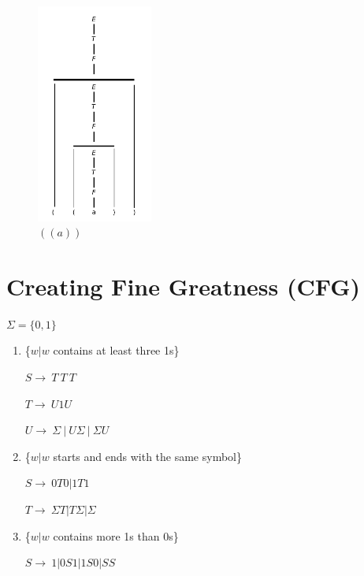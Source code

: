 \documentclass[10pt,reqno,sumlimits]{amsart}
\theoremstyle{plain}
\theoremstyle{definition}
\newcommand{\1}{{\bf 1}}
\numberwithin{equation}{section}
\begin{document}
\begin{figure}[htbp]
\centerline{
    \mbox{\includegraphics[width=1.5in]{figures/3_1_d.pdf}}
  }
  \caption{$((a))$}
  \label{fig:fit}
\end{figure}

\section {Creating Fine Greatness (CFG)}
\hspace{0.2in}$\Sigma = \{0,1\}$
\begin{enumerate}
\item \{$w|w$ contains at least three 1s\}

\hspace{0.3in}$S\rightarrow\ T\ T\ T$

\hspace{0.3in}$T\rightarrow\ U1U$

\hspace{0.3in}$U\rightarrow\ \Sigma\ |\ U\Sigma\ |\ \Sigma U$

\item \{$w|w$ starts and ends with the same symbol\}

\hspace{0.3in}$S\rightarrow\ 0T0 | 1T1$

\hspace{0.3in}$T\rightarrow\ \Sigma T | T\Sigma | \Sigma$

\item \{$w|w$ contains more 1s than 0s\}

\hspace{0.3in}$S\rightarrow\ 1 | 0S1 | 1S0 | SS$


\end{enumerate}
\end{document}
